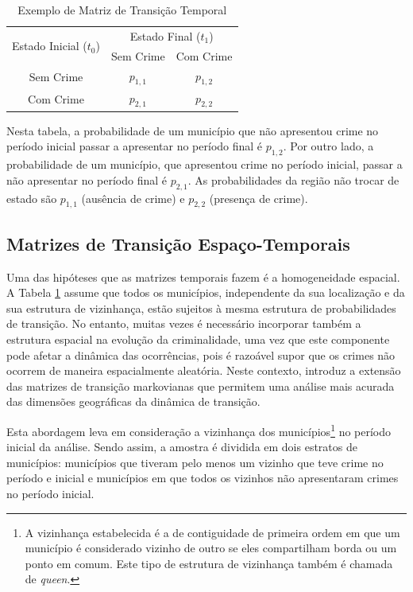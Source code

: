 \documentclass[12pt,openright,oneside,a4paper,english,french,spanish]{abntex2}
\numberwithin{table}{section} %
\numberwithin{figure}{section} %
\newcommand{\co}{\citeonline}
\begin{document}
\begin{table}[H]
\centering
        \begin{tabular}{ccc}
            \hline
            \multirow{2}{*}{Estado Inicial ($t_0$)} & \multicolumn{2}{c}{Estado Final ($t_1$)}  \\\cline{2-3} 
                                     & \multicolumn{1}{l}{Sem Crime} & \multicolumn{1}{l}{Com Crime} \\\hline
            {Sem Crime} & {$p_{1,1}$} & {$p_{1,2}$} \\                \hline
            {Com Crime} & {$p_{2,1}$} & {$p_{2,2}$} \\                \hline
        \end{tabular}
    \caption{Exemplo de Matriz de Transição Temporal}
    \label{tab:matriz_transicao_temporal_generica}
\end{table}

Nesta tabela, a probabilidade de um município que não apresentou crime no período inicial passar a apresentar no período final é $p_{1,2}$. Por outro lado, a probabilidade de um município, que apresentou crime no período inicial, passar a não apresentar no período final é $p_{2,1}$. As probabilidades da região não trocar de estado são $p_{1,1}$ (ausência de crime) e $p_{2,2}$ (presença de crime).

\subsection{Matrizes de Transição Espaço-Temporais\label{sec:espaco_temporais_acoplamento}}

Uma das hipóteses que as matrizes temporais fazem é a homogeneidade espacial. A Tabela \ref{tab:matriz_transicao_temporal_generica} assume que todos os municípios, independente da sua localização e da sua estrutura de vizinhança, estão sujeitos à mesma estrutura de probabilidades de transição. No entanto, muitas vezes é necessário incorporar também a estrutura espacial na evolução da criminalidade, uma vez que este componente pode afetar a dinâmica das ocorrências, pois é razoável supor que os crimes não ocorrem de maneira espacialmente aleatória. Neste contexto, \co{rey2001spatial} introduz a extensão das matrizes de transição markovianas que permitem uma análise mais acurada das dimensões geográficas da dinâmica de transição.

Esta abordagem leva em consideração a vizinhança dos municípios\footnote{A vizinhança estabelecida é a de contiguidade de primeira ordem em que um município é considerado vizinho de outro se eles compartilham borda ou um ponto em comum. Este tipo de estrutura de vizinhança também é chamada de \textit{queen}.} no período inicial da análise. Sendo assim, a amostra é dividida em dois estratos de municípios: municípios que tiveram pelo menos um vizinho que teve crime no período e inicial e municípios em que todos os vizinhos não apresentaram crimes no período inicial.
\end{document}
